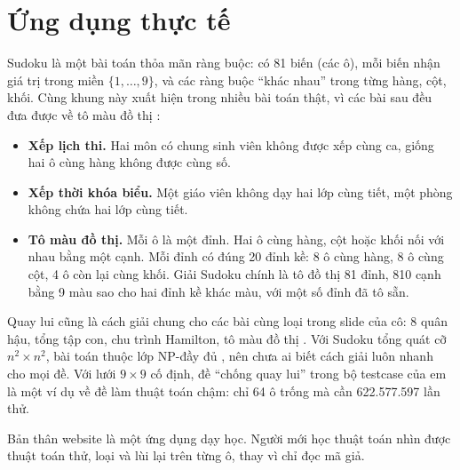 \section{Ứng dụng thực tế}

Sudoku là một bài toán thỏa mãn ràng buộc: có 81 biến (các ô), mỗi biến nhận giá trị trong miền \(\{1, \ldots, 9\}\), và các ràng buộc ``khác nhau'' trong từng hàng, cột, khối. Cùng khung này xuất hiện trong nhiều bài toán thật, vì các bài sau đều đưa được về tô màu đồ thị \cite{wikipedia-graph-coloring}:

\begin{itemize}
  \item \textbf{Xếp lịch thi.} Hai môn có chung sinh viên không được xếp cùng ca, giống hai ô cùng hàng không được cùng số.
  \item \textbf{Xếp thời khóa biểu.} Một giáo viên không dạy hai lớp cùng tiết, một phòng không chứa hai lớp cùng tiết.
  \item \textbf{Tô màu đồ thị.} Mỗi ô là một đỉnh. Hai ô cùng hàng, cột hoặc khối nối với nhau bằng một cạnh. Mỗi đỉnh có đúng 20 đỉnh kề: 8 ô cùng hàng, 8 ô cùng cột, 4 ô còn lại cùng khối. Giải Sudoku chính là tô đồ thị 81 đỉnh, 810 cạnh bằng 9 màu sao cho hai đỉnh kề khác màu, với một số đỉnh đã tô sẵn.
\end{itemize}

Quay lui cũng là cách giải chung cho các bài cùng loại trong slide của cô: 8 quân hậu, tổng tập con, chu trình Hamilton, tô màu đồ thị \cite{slide-backtracking}. Với Sudoku tổng quát cỡ \(n^2 \times n^2\), bài toán thuộc lớp NP-đầy đủ \cite{wikipedia-sudoku-math}, nên chưa ai biết cách giải luôn nhanh cho mọi đề. Với lưới \(9 \times 9\) cố định, đề ``chống quay lui'' trong bộ testcase của em là một ví dụ về đề làm thuật toán chậm: chỉ 64 ô trống mà cần 622.577.597 lần thử.

Bản thân website là một ứng dụng dạy học. Người mới học thuật toán nhìn được thuật toán thử, loại và lùi lại trên từng ô, thay vì chỉ đọc mã giả.
